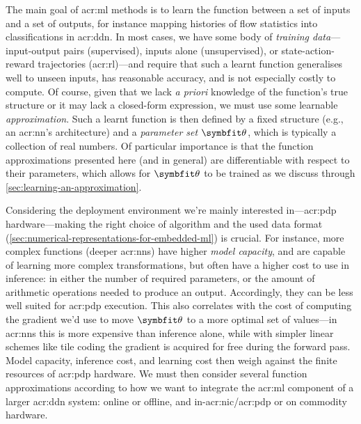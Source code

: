 The main goal of \gls{acr:ml} methods is to learn the function between a set of inputs and a set of outputs, for instance mapping histories of flow statistics into classifications in \gls{acr:ddn}.
In most cases, we have some body of \emph{training data}---input-output pairs (supervised), inputs alone (unsupervised), or state-action-reward trajectories (\gls{acr:rl})---and require that such a learnt function generalises well to unseen inputs, has reasonable accuracy, and is not especially costly to compute.
Of course, given that we lack \emph{a priori} knowledge of the function's true structure or it may lack a closed-form expression, we must use some learnable \emph{approximation}.
Such a learnt function is then defined by a fixed structure (e.g., an \gls{acr:nn}'s architecture) and a \emph{parameter set} $\wvec{}$, which is typically a collection of real numbers.
Of particular importance is that the function approximations presented here (and in general) are differentiable with respect to their parameters, which allows for $\wvec{}$ to be trained as we discuss through \cref{sec:learning-an-approximation}.

Considering the deployment environment we're mainly interested in---\gls{acr:pdp} hardware---making the right choice of algorithm and the used data format (\cref{sec:numerical-representations-for-embedded-ml}) is crucial.
For instance, more complex functions (deeper \glspl{acr:nn}) have higher \emph{model capacity}, and are capable of learning more complex transformations, but often have a higher cost to use in inference: in either the number of required parameters, or the amount of arithmetic operations needed to produce an output.
Accordingly, they can be less well suited for \gls{acr:pdp} execution.
This also correlates with the cost of computing the gradient we'd use to move $\wvec{}$ to a more optimal set of values---in \glspl{acr:nn} this is more expensive than inference alone, while with simpler linear schemes like tile coding the gradient is acquired for free during the forward pass.
Model capacity, inference cost, and learning cost then weigh against the finite resources of \gls{acr:pdp} hardware.
We must then consider several function approximations according to how we want to integrate the \gls{acr:ml} component of a larger \gls{acr:ddn} system: online or offline, and in-\gls{acr:nic}/\gls{acr:pdp} or on commodity hardware.





